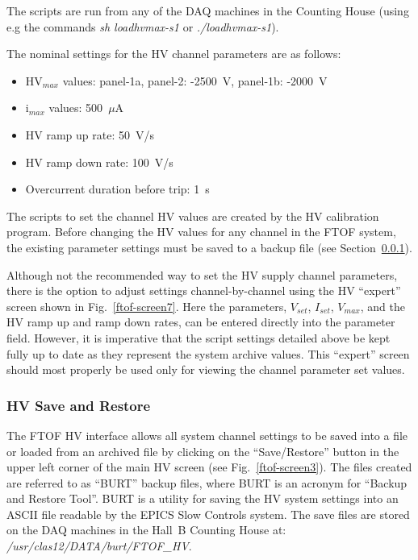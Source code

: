 \documentclass[12pt]{article}
\begin{document}
The scripts are run from any of the DAQ machines in the Counting House (using e.g the
commands {\it sh loadhvmax-s1} or {\it ./loadhvmax-s1}).

The nominal settings for the HV channel parameters are as follows:

\begin{itemize}
\item HV$_{max}$ values: panel-1a, panel-2: -2500~V, panel-1b: -2000~V
\item i$_{max}$ values: 500~$\mu$A
\item HV ramp up rate: 50~V/s
\item HV ramp down rate: 100~V/s
\item Overcurrent duration before trip: 1~s
\end{itemize}

The scripts to set the channel HV values are created by the HV calibration program. 
Before changing the HV values for any channel in the FTOF system, the existing parameter 
settings must be saved to a backup file (see Section~\ref{save-restore}).

Although not the recommended way to set the HV supply channel parameters, there is the 
option to adjust settings channel-by-channel using the HV ``expert'' screen shown in 
Fig.~\ref{ftof-screen7}. Here the parameters, $V_{set}$, $I_{set}$, $V_{max}$, and the HV 
ramp up and ramp down rates, can be entered directly into the parameter field. However, 
it is imperative that the script settings detailed above be kept fully up to date as 
they represent the system archive values. This ``expert'' screen should most properly 
be used only for viewing the channel parameter set values.

\subsubsection{HV Save and Restore}
\label{save-restore}

The FTOF HV interface allows all system channel settings to be saved into a file or 
loaded from an archived file by clicking on the ``Save/Restore'' button in the upper 
left corner of the main HV screen (see Fig.~\ref{ftof-screen3}). The files created are 
referred to as ``BURT'' backup files, where BURT is an acronym for ``Backup and Restore 
Tool''. BURT is a utility for saving the HV system settings into an ASCII file readable 
by the EPICS Slow Controls system. The save files are stored on the DAQ machines in the 
Hall~B Counting House at: {\it /usr/clas12/DATA/burt/FTOF\_HV}.
\end{document}
